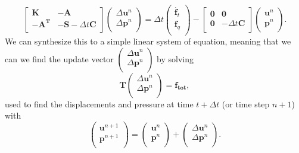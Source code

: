 \documentclass{article}
\begin{document}
\begin{equation}
\begin{bmatrix}
\mathbf{K} & \mathbf{-A} \\
\mathbf{-A^T} & \mathbf{-S} - \Delta t\mathbf{C}  \\
\end{bmatrix}
\begin{pmatrix}
\Delta\mathbf{u}^n \\
\Delta\mathbf{p}^n \\
\end{pmatrix}
=
\Delta t
\begin{pmatrix}
\dot{\mathbf{f}_t} \\
\mathbf{f}_q \\
\end{pmatrix}
-
\begin{bmatrix}
\mathbf{0} & \mathbf{0} \\
\mathbf{0} & -\Delta t\mathbf{C} \\
\end{bmatrix}
\begin{pmatrix}
\mathbf{u}^n \\
\mathbf{p}^n \\
\end{pmatrix}.
\end{equation}
We can synthesize this to a simple linear system of equation, meaning that we can we find the update vector 
$\begin{pmatrix}
\Delta\mathbf{u}^n \\
\Delta\mathbf{p}^n \\
\end{pmatrix}$
by solving 
\begin{equation}
\mathbf{T}
\begin{pmatrix}
\Delta\mathbf{u}^n \\
\Delta\mathbf{p}^n \\
\end{pmatrix}
=
\mathbf{f_{\text{tot}}},
\end{equation}
used to find the displacements and pressure at time $t + \Delta t$ (or time step $n+1$) with
\begin{equation}
\begin{pmatrix}
\mathbf{u}^{n+1} \\
\mathbf{p}^{n+1} \\
\end{pmatrix}
=
\begin{pmatrix}
\mathbf{u}^{n} \\
\mathbf{p}^{n} \\
\end{pmatrix}
+
\begin{pmatrix}
\Delta\mathbf{u}^n \\
\Delta\mathbf{p}^n \\
\end{pmatrix}.
\end{equation}
\end{document}
